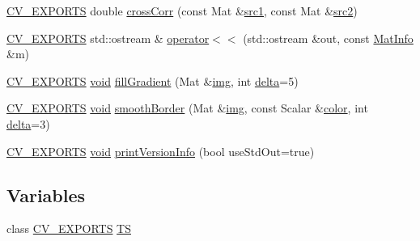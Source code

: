 \begin{DoxyCompactItemize}
\item 
\hyperlink{core_2types__c_8h_a1bf9f0e121b54272da02379cfccd0a2b}{C\-V\-\_\-\-E\-X\-P\-O\-R\-T\-S} double \hyperlink{namespacecvtest_a7dbcf42c2486a0fde93ca14400d9a63e}{cross\-Corr} (const Mat \&\hyperlink{core__c_8h_a897de4702c922f4cccda0d57ccdcafb3}{src1}, const Mat \&\hyperlink{core__c_8h_a7561a36d48069d54a6c8ac4e4750edfd}{src2})
\item 
\hyperlink{core_2types__c_8h_a1bf9f0e121b54272da02379cfccd0a2b}{C\-V\-\_\-\-E\-X\-P\-O\-R\-T\-S} std\-::ostream \& \hyperlink{namespacecvtest_a26d3e3d171c7188f1930582ad5942eeb}{operator$<$$<$} (std\-::ostream \&out, const \hyperlink{structcvtest_1_1MatInfo}{Mat\-Info} \&m)
\item 
\hyperlink{core_2types__c_8h_a1bf9f0e121b54272da02379cfccd0a2b}{C\-V\-\_\-\-E\-X\-P\-O\-R\-T\-S} \hyperlink{legacy_8hpp_a8bb47f092d473522721002c86c13b94e}{void} \hyperlink{namespacecvtest_a05033377cd913b17c1c21235981e1c3e}{fill\-Gradient} (Mat \&\hyperlink{legacy_8hpp_a5349238b3772bed6eae0fda3117ccfef}{img}, int \hyperlink{legacy_8hpp_ac867054f00f4be8b1f3ebce6fba31982}{delta}=5)
\item 
\hyperlink{core_2types__c_8h_a1bf9f0e121b54272da02379cfccd0a2b}{C\-V\-\_\-\-E\-X\-P\-O\-R\-T\-S} \hyperlink{legacy_8hpp_a8bb47f092d473522721002c86c13b94e}{void} \hyperlink{namespacecvtest_ad269b0afda8fae3f66b52812be976146}{smooth\-Border} (Mat \&\hyperlink{legacy_8hpp_a5349238b3772bed6eae0fda3117ccfef}{img}, const Scalar \&\hyperlink{core__c_8h_a4ea898fa4dd23d613d19923509d8e249}{color}, int \hyperlink{legacy_8hpp_ac867054f00f4be8b1f3ebce6fba31982}{delta}=3)
\item 
\hyperlink{core_2types__c_8h_a1bf9f0e121b54272da02379cfccd0a2b}{C\-V\-\_\-\-E\-X\-P\-O\-R\-T\-S} \hyperlink{legacy_8hpp_a8bb47f092d473522721002c86c13b94e}{void} \hyperlink{namespacecvtest_ae4cdd987333c3910e7b991b32f14bf7a}{print\-Version\-Info} (bool use\-Std\-Out=true)
\end{DoxyCompactItemize}
\subsection*{Variables}
\begin{DoxyCompactItemize}
\item 
class \hyperlink{core_2types__c_8h_a1bf9f0e121b54272da02379cfccd0a2b}{C\-V\-\_\-\-E\-X\-P\-O\-R\-T\-S} \hyperlink{namespacecvtest_a61d75b2d1c52a63797c1516e029b9cb0}{T\-S}
\end{DoxyCompactItemize}



